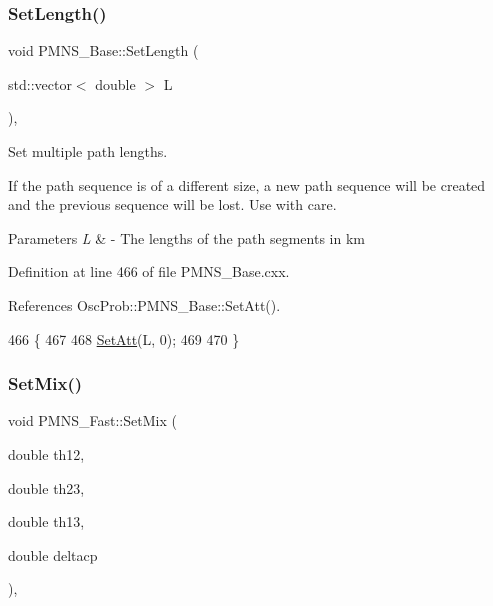 \subsubsection{\texorpdfstring{Set\+Length()}{SetLength()}\hspace{0.1cm}{\footnotesize\ttfamily [2/2]}}
{\footnotesize\ttfamily void P\+M\+N\+S\+\_\+\+Base\+::\+Set\+Length (\begin{DoxyParamCaption}\item[{std\+::vector$<$ double $>$}]{L }\end{DoxyParamCaption})\hspace{0.3cm}{\ttfamily [virtual]}, {\ttfamily [inherited]}}

Set multiple path lengths.

If the path sequence is of a different size, a new path sequence will be created and the previous sequence will be lost. Use with care.


\begin{DoxyParams}{Parameters}
{\em L} & -\/ The lengths of the path segments in km \\
\hline
\end{DoxyParams}


Definition at line 466 of file P\+M\+N\+S\+\_\+\+Base.\+cxx.



References Osc\+Prob\+::\+P\+M\+N\+S\+\_\+\+Base\+::\+Set\+Att().


\begin{DoxyCode}
466                                             \{
467 
468   \hyperlink{classOscProb_1_1PMNS__Base_aba565962a440d14bee7a2a96d2eca2c5}{SetAtt}(L, 0);
469 
470 \}
\end{DoxyCode}
\mbox{\label{classOscProb_1_1PMNS__Fast_ad849b2231d99c5d66fb3ade8efb896e1}} 
\subsubsection{\texorpdfstring{Set\+Mix()}{SetMix()}}
{\footnotesize\ttfamily void P\+M\+N\+S\+\_\+\+Fast\+::\+Set\+Mix (\begin{DoxyParamCaption}\item[{double}]{th12,  }\item[{double}]{th23,  }\item[{double}]{th13,  }\item[{double}]{deltacp }\end{DoxyParamCaption})\hspace{0.3cm}{\ttfamily [virtual]}, {\ttfamily [inherited]}}

